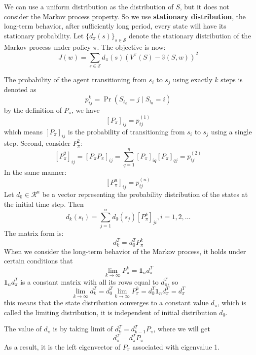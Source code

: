 \documentclass[10pt]{elegantbook}
\begin{document}
We can use a uniform distribution as the distribution of $S$, but it does not consider the Markov process property. So we use \textbf{stationary distribution},
the long-term behavior, after sufficiently long period, every state will have its stationary probability. Let $\{ d_{\pi}(s) \}_{s \in \mathcal S}$ denote 
the stationary distribution of the Markov process under policy $\pi$. The objective is now:
\begin{equation}
    J(w) = \sum_{s \in \mathcal S} d_{\pi}(s) (V^{\pi}(S) - \hat v(S, w))^2
\end{equation}

\begin{definition}
    The probability of the agent transitioning from $s_i$ to $s_j$ using exactly $k$ steps is denoted as
    \[ p_{ij}^k = \Pr(S_{t_k} = j \mid S_{t_0} = i) \]
    by the definition of $P_{\pi}$, we have
    \[ [P_{\pi}]_{ij} = p_{ij}^{(1)} \]
    which means $[P_{\pi}]_{ij}$ is the probability of transitioning from $s_i$ to $s_j$ using a
single step. Second, consider $P^2_{\pi}$:
    \[ [P^2_{\pi}]_{ij} = [P_{\pi}P_{\pi}]_{ij} = \sum_{q=1}^n [P_{\pi}]_{iq}[P_{\pi}]_{qj} = p_{ij}^{(2)} \]
    In the same manner:
    \[ [P^n_{\pi}]_{ij} = p_{ij}^{(n)} \]
    Let $d_0 \in \mathcal R^n $ be a vector representing the probability distribution of the states at
the initial time step. Then 
    \begin{equation}
        d_k(s_i) = \sum_{j=1}^n d_0(s_j) [P^k_{\pi}]_{ji}, i = 1, 2, \ldots
    \end{equation}
    The matrix form is:
    \[ d_k^T = d_0^T P_{\pi}^k \]
    When we consider the long-term behavior of the Markov process, it holds under certain conditions that
    \[ \lim_{k \rightarrow \infty} P_{\pi}^k = \mathbf 1_n d_{\pi}^T \]
    $\mathbf 1_n d_{\pi}^T$ is a constant matrix with all its rows equal to $d_{\pi}^T$, 
    so
    \begin{equation} \label{eq:limiting_distribution}
        \lim_{k \rightarrow \infty} d_k^T = d_0^T \lim_{k \rightarrow \infty} P_{\pi}^k = d_0^T \mathbf 1_n d_{\pi}^T = d_{\pi}^T
    \end{equation}
    this means that the state distribution converges to a constant value $d_{\pi}$, which is called the limiting distribution, it is 
    independent of initial distribution $d_0$.

    The value of $d_{\pi}$ is by taking limit of $ d_k^T = d_{k-1}^T P_{\pi}$, where we will get
    \begin{equation} \label{eq:stationary_distribution}
        d_{\pi}^T = d_{\pi}^T P_{\pi}
    \end{equation}
    As a result, it is the left eigenvector of $P_{\pi}$ associated with eigenvalue 1.


\end{definition}
\end{document}
